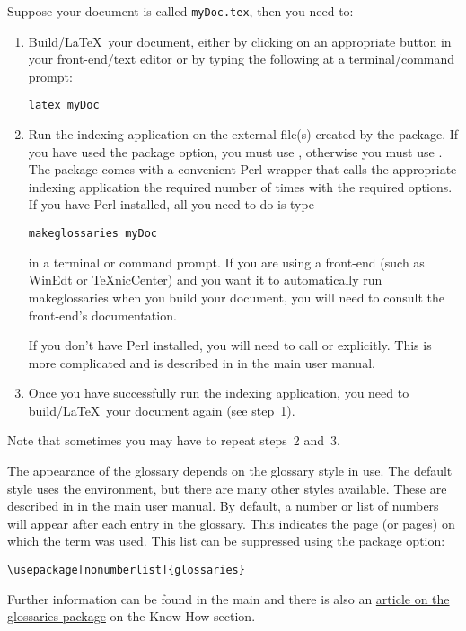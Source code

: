 \documentclass{nlctdoc}
\begin{document}
Suppose your document is called \texttt{myDoc.tex}, then you need
to:
\begin{enumerate}
\item Build/\LaTeX\ your document, either by clicking on an
appropriate button in your front-end/text editor or by typing the
following at a terminal/command prompt:
\begin{verbatim}
latex myDoc
\end{verbatim}

\item Run the indexing application on the external file(s) created
by the  package. If you have used the 
package option, you must use , otherwise you must use 
. The  package comes with a convenient
Perl wrapper that calls the appropriate indexing application the
required number of times with the required options. If you have Perl
installed, all you need to do is type
\begin{verbatim}
makeglossaries myDoc
\end{verbatim}
in a terminal or command prompt. If you are using a front-end (such
as WinEdt or TeXnicCenter) and you want it to automatically run
makeglossaries when you build your document, you will need to
consult the front-end's documentation.

If you don't have Perl installed, you will need to call
 or  explicitly. This is more complicated
and is described in
 in the main  user manual.

\item Once you have successfully run the indexing application, you
need to build/\LaTeX\ your document again (see step~1).
\end{enumerate}
Note that sometimes you may have to repeat steps~2 and~3.

The appearance of the glossary depends on the glossary style in
use. The default style uses the  environment, 
but there are many other styles available. These are described
in 
in the main  user manual.
By default, a number or list of numbers will appear after each entry 
in the glossary. This indicates the page (or pages)
on which the term was used. This list can be suppressed using
the  package option:
\begin{verbatim}
\usepackage[nonumberlist]{glossaries}
\end{verbatim}

Further information can be found in the main 
and there is also an
\href{http://www.latex-community.org/index.php?option=com_content&view=article&id=263:glossaries-nomenclature-lists-of-symbols-and-acronyms&catid=55:latex-general&Itemid=114}{article on the glossaries package}
on the 
Know How section.
\end{document}
